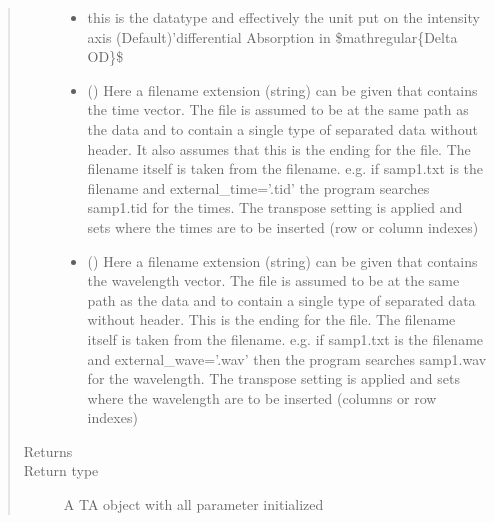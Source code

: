 \documentclass[letterpaper,10pt,english]{sphinxmanual}
\begin{document}
\begin{fulllineitems}
\begin{fulllineitems}
\begin{quote}
\begin{description}
\begin{itemize}
\item {} 
 \textendash{} this is the datatype and effectively the unit put on the intensity axis
(Default)’differential Absorption in \$mathregular\{Delta OD\}\$

\item {} 
 (\sphinxstyleliteralemphasis{\sphinxupquote{ (}}\sphinxstyleliteralemphasis{\sphinxupquote{)}}) \textendash{} Here a filename extension (string) can be given that contains the time vector.
The file is assumed to be at the same path as the data and to contain a single
type of separated data without header. It also assumes that this is the ending
for the file. The filename itself is taken from the filename.
e.g. if samp1.txt is the filename and external\_time=’.tid’ the program searches
samp1.tid for the times. The transpose setting is applied and sets where the times are
to be inserted (row or column indexes)

\item {} 
 (\sphinxstyleliteralemphasis{\sphinxupquote{ (}}\sphinxstyleliteralemphasis{\sphinxupquote{)}}) \textendash{} Here a filename extension (string) can be given that contains the wavelength vector.
The file is assumed to be at the same path as the data and to contain a single type
of separated data without header. This is the ending for the file. The filename itself
is taken from the filename. e.g. if samp1.txt is the filename and external\_wave=’.wav’
then the program searches samp1.wav for the wavelength. The transpose setting is applied
and sets where the wavelength are to be inserted (columns or row indexes)

\end{itemize}

\item[{Returns}] \leavevmode


\item[{Return type}] \leavevmode
A TA object with all parameter initialized

\end{description}\end{quote}

\end{fulllineitems}
\end{fulllineitems}
\end{document}

